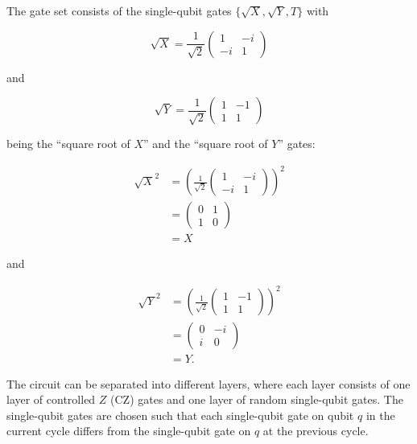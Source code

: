 The gate set consists of the single-qubit gates $\{\sqrt{X}, \sqrt{Y}, T\}$ with

\begin{equation}
  \sqrt{X} = \frac{1}{\sqrt{2}} \begin{pmatrix}
    1 & - i \\
    - i & 1
    \end{pmatrix}
\end{equation}

and

\begin{equation}
  \sqrt{Y} = \frac{1}{\sqrt{2}} \begin{pmatrix}
    1 & -1  \\
    1 & 1 
  \end{pmatrix}
\end{equation}

being the ``square root of $X$'' and the ``square root of $Y$'' gates:

\begin{align}
  \sqrt{X}^2 &= \left(\frac{1}{\sqrt{2}} \begin{pmatrix}
    1 & - i \\
    - i & 1
  \end{pmatrix}\right)^2 \\
  &= \begin{pmatrix}
    0 & 1 \\
    1 & 0
  \end{pmatrix} \\
  &= X
\end{align}

and

\begin{align}
  \sqrt{Y}^2 &= \left(\frac{1}{\sqrt{2}} \begin{pmatrix}
    1 & -1 \\
    1 & 1
  \end{pmatrix}\right)^2 \\
  &= \begin{pmatrix}
    0 & -i \\
    i & 0
  \end{pmatrix} \\
  &= Y.
\end{align}

The circuit can be separated into different layers, where each layer consists of one
layer of controlled $Z$ (CZ) gates and one layer of random single-qubit gates. The single-qubit
gates are chosen such that each single-qubit gate on qubit $q$ in the current
cycle differs from the single-qubit gate on $q$ at the previous cycle.

